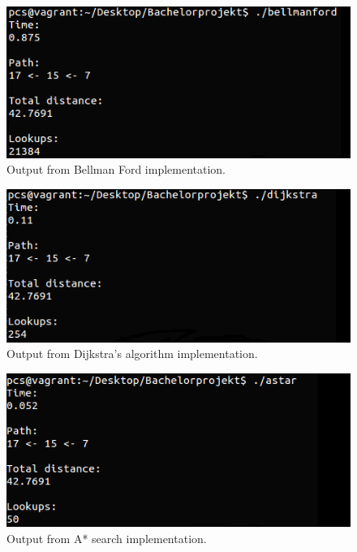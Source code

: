 \documentclass[11pt]{article}
\begin{document}
\begin{figure}[H]
\centering
\includegraphics[scale=0.8]{Pictures/bellmanford-output.png}
\caption[]{Output from Bellman Ford implementation.}
\end{figure}

\begin{figure}[H]
\centering
\includegraphics[scale=0.8]{Pictures/dijkstra-output.png}
\caption[]{Output from Dijkstra's algorithm implementation.}
\end{figure}

\begin{figure}[H]
\centering
\includegraphics[scale=0.8]{Pictures/a-star-output.png}
\caption[]{Output from A* search implementation.}
\end{figure}
\end{document}
